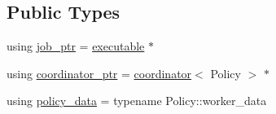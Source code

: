 \subsection*{Public Types}
\begin{DoxyCompactItemize}
\item 
using \hyperlink{classactor__zeta_1_1executor_1_1worker_a74e3d9df71ad0b0df8d0c5403f8e642a}{job\+\_\+ptr} = \hyperlink{structactor__zeta_1_1executor_1_1executable}{executable} $\ast$
\item 
using \hyperlink{classactor__zeta_1_1executor_1_1worker_a0f64bbb63577325b5217ccee17a28738}{coordinator\+\_\+ptr} = \hyperlink{classactor__zeta_1_1executor_1_1coordinator}{coordinator}$<$ Policy $>$ $\ast$
\item 
using \hyperlink{classactor__zeta_1_1executor_1_1worker_ad8f39b0132441963ede8c1e8435aebb2}{policy\+\_\+data} = typename Policy\+::worker\+\_\+data
\end{DoxyCompactItemize}

